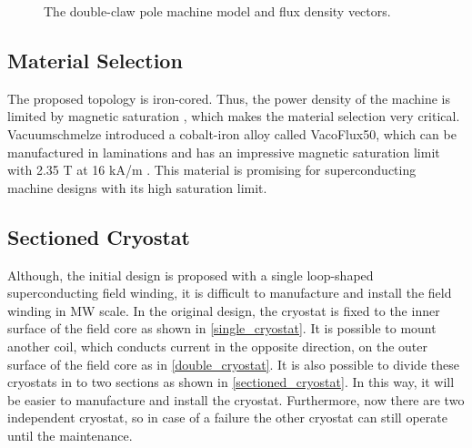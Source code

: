 \documentclass[12pt]{iopart}
\begin{document}
\begin{figure}[]
  \caption{The double-claw pole machine model and flux density vectors.} 
  \label{double_claw_parts}
\end{figure}

\subsection{Material Selection}

The proposed topology is iron-cored. Thus, the power density of the machine is limited by magnetic saturation , which makes the material selection very critical.  Vacuumschmelze introduced a cobalt-iron alloy called VacoFlux50, which  can be manufactured in laminations and has an impressive magnetic saturation limit with 2.35 T at 16 kA/m \cite{vacoflux}. This material is promising for superconducting machine designs with its high saturation limit.


\subsection{Sectioned Cryostat}

Although, the initial design is proposed with a single loop-shaped superconducting field winding, it is difficult to manufacture and install the field winding in MW scale. In the original design, the cryostat is fixed to the inner surface of the field core as shown in \ref{single_cryostat}. It is possible to mount another coil, which conducts current in the opposite direction, on the outer surface of the field core as in \ref{double_cryostat}. It is also possible to divide these cryostats in to two sections as shown in \ref{sectioned_cryostat}. In this way, it will be easier to manufacture and install the cryostat. Furthermore, now there are two independent cryostat, so in case of a failure the other cryostat can still operate until the maintenance. 
\end{document}
